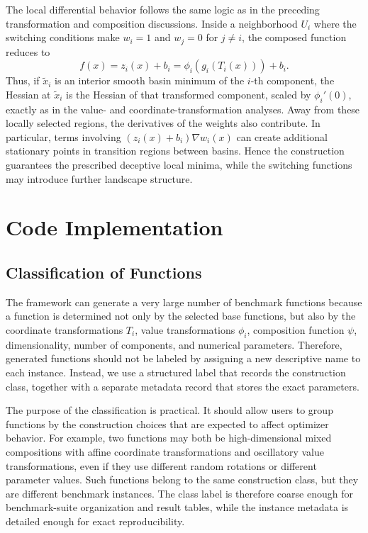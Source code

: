 \documentclass[11pt,a4paper]{article}
\theoremstyle{remark}
\theoremstyle{plain}
\begin{document}
The local differential behavior follows the same logic as in the preceding
transformation and composition discussions. Inside a neighborhood \(U_i\) where
the switching conditions make \(w_i=1\) and \(w_j=0\) for \(j\ne i\), the
composed function reduces to
\[
	f(x)=z_i(x)+b_i=\phi_i(g_i(T_i(x)))+b_i.
\]
Thus, if \(\tilde x_i\) is an interior smooth basin minimum of the \(i\)-th
component, the Hessian at \(\tilde x_i\) is the Hessian of that transformed
component, scaled by \(\phi_i'(0)\), exactly as in the value- and
coordinate-transformation analyses. Away from these locally selected regions,
the derivatives of the weights also contribute. In particular, terms involving
\((z_i(x)+b_i)\nabla w_i(x)\) can create additional stationary points in
transition regions between basins. Hence the construction guarantees the
prescribed deceptive local minima, while the switching functions may introduce
further landscape structure.


\section{Code Implementation}
\subsection{Classification of Functions}

The framework can generate a very large number of benchmark functions because a
function is determined not only by the selected base functions, but also by the
coordinate transformations \(T_i\), value transformations \(\phi_i\),
composition function \(\psi\), dimensionality, number of components, and
numerical parameters. Therefore, generated functions should not be labeled by
assigning a new descriptive name to each instance. Instead, we use a structured
label that records the construction class, together with a separate metadata
record that stores the exact parameters.

The purpose of the classification is practical. It should allow users to group
functions by the construction choices that are expected to affect optimizer
behavior. For example, two functions may both be high-dimensional mixed
compositions with affine coordinate transformations and oscillatory value
transformations, even if they use different random rotations or different
parameter values. Such functions belong to the same construction class, but they
are different benchmark instances. The class label is therefore coarse enough
for benchmark-suite organization and result tables, while the instance metadata
is detailed enough for exact reproducibility.
\end{document}
